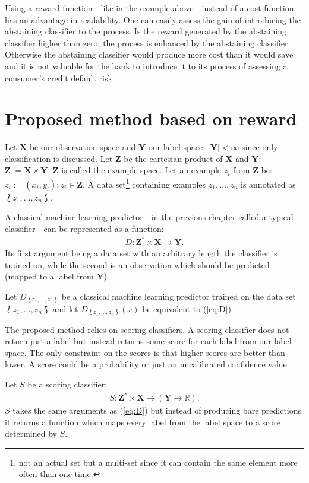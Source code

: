 \documentclass[twoside,11pt]{article}
\def\ds{\Lbag z_1,\dots,z_n \Rbag}
\begin{document}
Using a reward function---like in the example
above---instead of a cost function has an advantage in
readability. One can easily assess the gain of introducing
the abstaining classifier to the process.
Is the reward generated by the abstaining classifier higher
than zero, the process is enhanced by the abstaining
classifier.
Otherwise the abstaining classifier would produce more
cost than it would save and it is not valuable for the
bank to introduce it to its process of assessing a
consumer's credit default risk.

\section{Proposed method based on reward}
\label{sec:method}

Let $\textbf{X}$ be our observation space and $\textbf{Y}$
our label space. $|\textbf{Y}| < \infty$ since only
classification is discussed. Let $\textbf{Z}$ be the
cartesian product of $\textbf{X}$ and $\textbf{Y}$:
$\textbf{Z} := \textbf{X} \times \textbf{Y}$.
$\textbf{Z}$ is called the example space.
Let an example $z_i$ from $\textbf{Z}$ be:
$z_i := (x_i, y_i); z_i \in \textbf{Z}$.
A data set\footnote{not an actual set but a multi-set since
it can contain the same element more often than one time.}
containing examples $z_1,\dots,z_n$ is annotated as
$\ds$.

A classical machine learning predictor---in the previous
chapter called a typical classifier---can be represented
as a function:
\begin{align}
  \label{eq:D}
  D: \textbf{Z}^* \times \textbf{X} \rightarrow \textbf{Y}.
\end{align}
Its first argument being a data set with an arbitrary
length the classifier is trained on, while the second is an
observation which should be predicted
(mapped to a label from $\textbf{Y}$).

Let $D_{\ds}$ be a classical machine
learning predictor trained on the data set $\ds$ and
let $D_{\ds}(x)$ be equivalent to (\ref{eq:D}).

The proposed method relies on scoring classifiers.
A scoring classifier does not return just
a label but instead returns some score for each label from
our label space.
The only constraint on the scores is that higher scores
are better than lower.
A score could be a probability or just an uncalibrated
confidence value \citep[see][]{vanderlooy_et_al_2009}.

Let $S$ be a scoring classifier:
\begin{align*}
  S: \textbf{Z}^* \times \textbf{X} \rightarrow
     (\textbf{Y} \rightarrow \mathbb{R}).
\end{align*}
$S$ takes the same arguments as (\ref{eq:D}) but instead
of producing bare predictions it returns a function which
maps every label from the label space to a score
determined by $S$.
\end{document}
